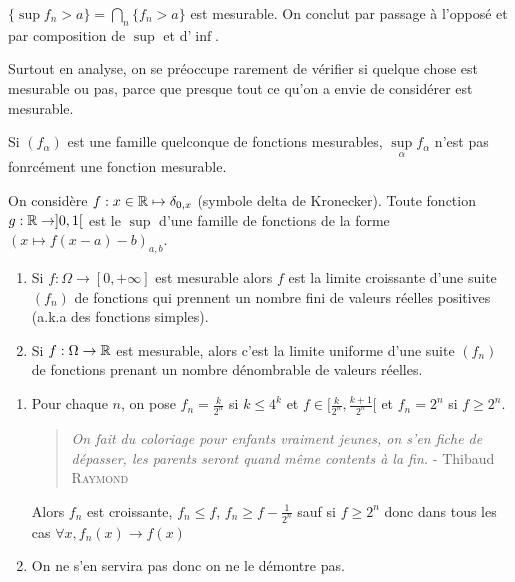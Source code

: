 \documentclass[10pt,a4paper,notitlepage ]{report}
\begin{document}
\begin{demo}
	$\{\sup f_n > a\} = \bigcap_n \{f_n > a\}$ est mesurable. On conclut par passage à l'opposé et par composition de $\sup$ et d'$\inf$.
\end{demo}

\begin{rem}
	Surtout en analyse, on se préoccupe rarement de vérifier si quelque chose est mesurable ou pas, parce que presque tout ce qu'on a envie de considérer est mesurable.
\end{rem}

\begin{rem}
	Si $(f_\alpha)$ est une famille quelconque de fonctions mesurables, $\underset\alpha\sup f_\alpha$ n'est pas fonrcément une fonction mesurable.
	
	\begin{exemple}
		On considère $f : x \in \mathbb R \mapsto \delta_{0,x}$ (symbole delta de Kronecker). Toute fonction $g : \mathbb R \rightarrow ]0,1[$ est le $\sup$ d'une famille de fonctions de la forme $(x\mapsto f(x-a)-b)_{a,b}$.
	\end{exemple}
\end{rem}

\begin{propriete}
	\begin{enumerate}
		\item Si $f:\Omega \rightarrow [0,+\infty]$ est mesurable alors $f$ est la limite croissante d'une suite $(f_n)$ de fonctions qui prennent un nombre fini de valeurs réelles positives (a.k.a des fonctions simples).
		\item Si $f: \Omega \rightarrow \mathbb R$ est mesurable, alors c'est la limite uniforme d'une suite $(f_n)$ de fonctions prenant un nombre dénombrable de valeurs réelles.
	\end{enumerate}
\end{propriete}

\begin{demo}
	\begin{enumerate}
		\item Pour chaque $n$, on pose $f_n = \frac k {2^n}$ si $k \le 4^k$ et $f\in[\frac k {2^n}, \frac {k+1}{2^n}[$ et $f_n = 2^n$ si $f \ge 2^n$.
		\begin{quote}
			\textit{On fait du coloriage pour enfants vraiment jeunes, on s'en fiche de dépasser, les parents seront quand même contents à la fin.} - Thibaud \textsc{Raymond}
		\end{quote}
		Alors $f_n$ est croissante, $f_n \le f$, $f_n \ge f-\frac 1 {2^n}$ sauf si $f\ge 2^n$ donc dans tous les cas $\forall x, f_n(x) \rightarrow f(x)$
		\item On ne s'en servira pas donc on ne le démontre pas.
	\end{enumerate}
\end{demo}
\end{document}
